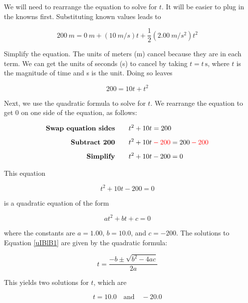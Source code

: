 \documentclass[../../main-ap-physics.tex]{subfiles}
\begin{document}
\vspace{1em}

We will need to rearrange the equation to solve for $t$. It will be easier to plug in the knowns first. Substituting known values leads to 

\begin{equation*}
    \SI{200}{m} = \SI{0}{m} + \left(\SI{10}{m/s}\right) t + \frac{1}{2}\left(\SI{2.00}{m/s^2}\right) t^2
\end{equation*}

Simplify the equation. The units of meters (m) cancel because they are in each term. We can get the units of seconds (s) to cancel by taking  $t = t\,\text{s}$, where $t$ is the magnitude of time and s is the unit. Doing so leaves

\begin{equation*}
    200 = 10t + t^2
\end{equation*}

Next, we use the quadratic formula to solve for $t$. We rearrange the equation to get 0 on one side of the equation, as follows:

\begin{align*}
    \textbf{Swap equation sides} \qquad & t^2 + 10t = 200\\[1ex]
    \textbf{Subtract 200} \qquad & t^2 + 10t \mathbin{\color{red} -} \textcolor{red}{200} = 200 \mathbin{\color{red} -} \textcolor{red}{200}\\[1ex]
    \textbf{Simplify} \qquad & t^2 + 10t - 200 = 0
\end{align*}

This equation

\begin{equation} \label{uIBlB1}
    t^2 + 10t - 200 = 0
\end{equation}

is a quadratic equation of the form

\begin{equation}
    a t^2 + bt + c = 0
\end{equation}

where the constants are $a = 1.00$, $b = 10.0$, and $c = -200$. The solutions to Equation \eqref{uIBlB1} are given by the quadratic formula:

\begin{equation}
    t = \frac{-b \pm \sqrt{b^2 - 4ac}}{2a}
\end{equation}

This yields two solutions for $t$, which are

\begin{equation*}
    t = 10.0 \quad \text{and} \quad -20.0
\end{equation*}
\end{document}
